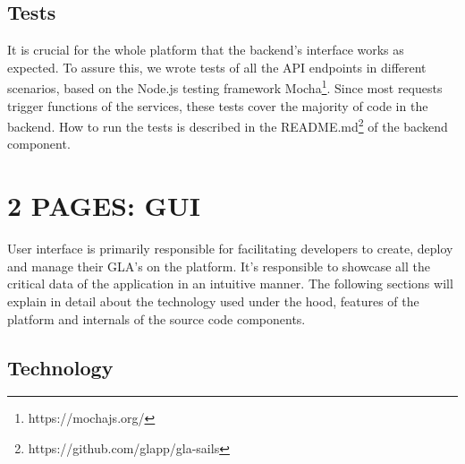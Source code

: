 \documentclass{seal_thesis}
\begin{document}
\subsection{Tests}
It is crucial for the whole platform that the backend's interface works as expected.
To assure this, we wrote tests of all the API endpoints in different scenarios, based on the Node.js testing framework Mocha\footnote{https://mochajs.org/}.
Since most requests trigger functions of the services, these tests cover the majority of code in the backend.
How to run the tests is described in the README.md\footnote{https://github.com/glapp/gla-sails} of the backend component.


\section{2 PAGES: GUI}

User interface is primarily responsible for facilitating developers to create, deploy and manage their GLA's on the platform. It's responsible to showcase all the critical data of the application in an intuitive manner. 
The following sections will explain in detail about the technology used under the hood, features of the platform and internals of the source code components.

\subsection{Technology}
\end{document}
